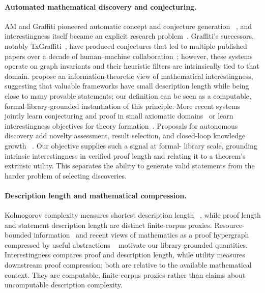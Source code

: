 \paragraph{Automated mathematical discovery and conjecturing.}
AM and Graffiti pioneered automatic concept and conjecture generation
~\citep{lenat1977am,fajtlowicz1988graffiti}, and interestingness itself became
an explicit research problem~\citep{colton2000interestingness}.
Graffiti's successors, notably TxGraffiti~\citep{davila2024txgraffiti}, have
produced conjectures that led to multiple published papers over a decade of
human--machine collaboration~\citep{davila2025txgraffiti10years}; however,
these systems operate on graph invariants and their heuristic filters are
intrinsically tied to that domain.
\citet{bengio2024aimathematician} propose an information-theoretic view
of mathematical interestingness, suggesting that valuable frameworks have small
description length while being close to many provable statements; our
definition can be seen as a computable, formal-library-grounded instantiation
of this principle.
More recent systems jointly learn conjecturing and proof in small axiomatic
domains~\citep{poesia2024minimo} or learn interestingness objectives for theory
formation~\citep{tsoukalas2025fermat}. Proposals for autonomous discovery add
novelty assessment, result selection, and closed-loop knowledge growth
~\citep{barkeshli2026structure}. Our objective supplies such a signal at formal-
library scale, grounding intrinsic interestingness in verified proof length and
relating it to a theorem's extrinsic utility. This separates the ability to
generate valid statements from the harder problem of selecting discoveries.

\paragraph{Description length and mathematical compression.}
Kolmogorov complexity measures shortest description length
~\citep{solomonoff1964,kolmogorov1965,livitanyi2008}, while proof length and
statement description length are distinct finite-corpus proxies. Resource-bounded
information~\citep{xu2020usable,blier2018description} and recent views of
mathematics as a proof hypergraph compressed by useful abstractions
~\citep{barkeshli2026structure,aksenov2026compression} motivate our
library-grounded quantities. Interestingness compares proof and description
length, while utility measures downstream proof compression; both are relative
to the available mathematical context. They are computable, finite-corpus
proxies rather than claims about uncomputable description complexity.

